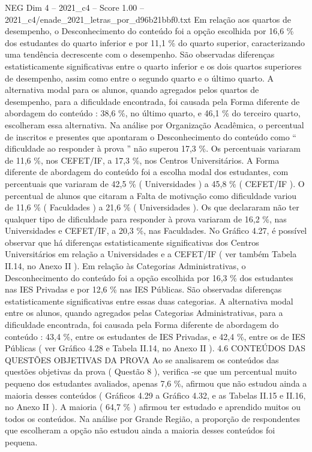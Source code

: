 \begin{textsample}{NEG Dim 4 – 2021\_c4 – Score 1.00 – 2021\_c4/enade\_2021\_letras\_por\_d96b21bbf0.txt}
Em relação aos quartos de desempenho, o Desconhecimento do conteúdo foi a opção escolhida por 16,6 \% dos estudantes do quarto inferior e por 11,1 \% do quarto superior, caracterizando uma tendência decrescente com o desempenho.
São observadas diferenças estatisticamente significativas entre o quarto inferior e os dois quartos superiores de desempenho, assim como entre o segundo quarto e o último quarto.
A alternativa modal para os alunos, quando agregados pelos quartos de desempenho, para a dificuldade encontrada, foi causada pela Forma diferente de abordagem do conteúdo : 38,6 \%, no último quarto, e 46,1 \% do terceiro quarto, escolheram essa alternativa.
Na análise por Organização Acadêmica, o percentual de inscritos e presentes que apontaram o Desconhecimento do conteúdo como “ dificuldade ao responder à prova ” não superou 17,3 \%.
Os percentuais variaram de 11,6 \%, nos CEFET/IF, a 17,3 \%, nos Centros Universitários.
A Forma diferente de abordagem do conteúdo foi a escolha modal dos estudantes, com percentuais que variaram de 42,5 \% ( Universidades ) a 45,8 \% ( CEFET/IF ).
O percentual de alunos que citaram a Falta de motivação como dificuldade variou de 11,6 \% ( Faculdades ) a 21,6 \% ( Universidades ).
Os que declararam não ter qualquer tipo de dificuldade para responder à prova variaram de 16,2 \%, nas Universidades e CEFET/IF, a 20,3 \%, nas Faculdades.
No Gráfico 4.27, é possível observar que há diferenças estatisticamente significativas dos Centros Universitários em relação a Universidades e a CEFET/IF ( ver também Tabela II.14, no Anexo II ).
Em relação às Categorias Administrativas, o Desconhecimento do conteúdo foi a opção escolhida por 16,3 \% dos estudantes nas IES Privadas e por 12,6 \% nas IES Públicas.
São observadas diferenças estatisticamente significativas entre essas duas categorias.
A alternativa modal entre os alunos, quando agregados pelas Categorias Administrativas, para a dificuldade encontrada, foi causada pela Forma diferente de abordagem do conteúdo : 43,4 \%, entre os estudantes de IES Privadas, e 42,4 \%, entre os de IES Públicas ( ver Gráfico 4.28 e Tabela II.14, no Anexo II ). 4.6 CONTEÚDOS DAS QUESTÕES OBJETIVAS DA PROVA Ao se analisarem os conteúdos das questões objetivas da prova ( Questão 8 ), verifica -se que um percentual muito pequeno dos estudantes avaliados, apenas 7,6 \%, afirmou que não estudou ainda a maioria desses conteúdos ( Gráficos 4.29 a Gráfico 4.32, e as Tabelas II.15 e II.16, no Anexo II ).
A maioria ( 64,7 \% ) afirmou ter estudado e aprendido muitos ou todos os conteúdos.
Na análise por Grande Região, a proporção de respondentes que escolheram a opção não estudou ainda a maioria desses conteúdos foi pequena.

\end{textsample}
